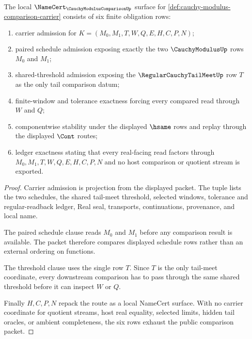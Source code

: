 \begin{theorem}
\label{thm:cauchy-modulus-comparison-namecert-obligations}
The local $\NameCert_{\CauchyModulusComparisonUp}$ surface for \autoref{def:cauchy-modulus-comparison-carrier} consists of six finite obligation rows:
\begin{enumerate}
\item carrier admission for $K=(M_0,M_1,T,W,Q,E,H,C,P,N)$;
\item paired schedule admission exposing exactly the two $\CauchyModulusUp$ rows $M_0$ and $M_1$;
\item shared-threshold admission exposing the $\RegularCauchyTailMeetUp$ row $T$ as the only tail comparison datum;
\item finite-window and tolerance exactness forcing every compared read through $W$ and $Q$;
\item componentwise stability under the displayed $\hsame$ rows and replay through the displayed $\Cont$ routes;
\item ledger exactness stating that every real-facing read factors through $M_0,M_1,T,W,Q,E,H,C,P,N$ and no host comparison or quotient stream is exported.
\end{enumerate}
\end{theorem}
\begin{proof}
Carrier admission is projection from the displayed packet. The tuple lists the two schedules, the shared tail-meet threshold, selected windows, tolerance and regular-readback ledger, Real seal, transports, continuations, provenance, and local name.

The paired schedule clause reads $M_0$ and $M_1$ before any comparison result is available. The packet therefore compares displayed schedule rows rather than an external ordering on functions.

The threshold clause uses the single row $T$. Since $T$ is the only tail-meet coordinate, every downstream comparison has to pass through the same shared threshold before it can inspect $W$ or $Q$.

Finally $H,C,P,N$ repack the route as a local NameCert surface. With no carrier coordinate for quotient streams, host real equality, selected limits, hidden tail oracles, or ambient completeness, the six rows exhaust the public comparison packet.
\end{proof}

